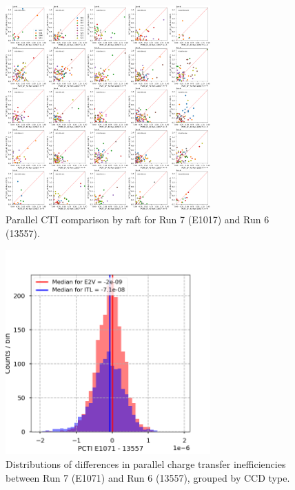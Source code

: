\begin{figure}[H]
\begin{centering}
\includegraphics[width=0.7\textwidth]{sections/figures/baselineCharacterization/13557_E1071_PCTI_EF_43.png}
\caption{Parallel CTI comparison by raft for Run 7 (E1017) and Run 6 (13557).}
\label{fig:parallel-cti}
\end{centering}
\end{figure}

\begin{figure}[H]
\begin{centering}
\includegraphics[width=0.7\textwidth]{sections/figures/baselineCharacterization/PCTI_13557_E1071_diff.png}
\caption{Distributions of differences in parallel charge transfer inefficiencies between Run 7 (E1071) and Run 6 (13557), grouped by CCD type.}
\label{fig:parallel-cti-dist}
\end{centering}
\end{figure}

